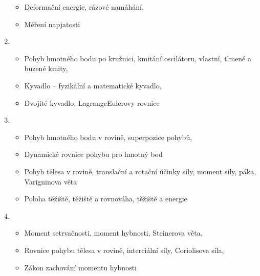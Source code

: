 \documentclass[letterpaper,10pt,english]{jupyterBook}
\begin{document}
\begin{enumerate}
\begin{itemize}
\item {} 
\sphinxAtStartPar
Deformační energie, rázové namáhání,

\item {} 
\sphinxAtStartPar
Měření napjatosti

\end{itemize}

\item {} 
\sphinxAtStartPar
{}
\begin{itemize}
\item {} 
\sphinxAtStartPar
Pohyb hmotného bodu po kružnici, kmitání oscilátoru, vlastní, tlmené a buzené kmity,

\item {} 
\sphinxAtStartPar
Kyvadlo – fyzikální a matematické kyvadlo,

\item {} 
\sphinxAtStartPar
Dvojité kyvadlo, Lagrange\sphinxhyphen{}Eulerovy rovnice

\end{itemize}

\item {} 
\sphinxAtStartPar
{}
\begin{itemize}
\item {} 
\sphinxAtStartPar
Pohyb hmotného bodu v rovině, superpozice pohybů,

\item {} 
\sphinxAtStartPar
Dynamické rovnice pohybu pro hmotný bod

\item {} 
\sphinxAtStartPar
Pohyb tělesa v rovině, translační a rotační účinky síly, moment síly, páka, Varigninova věta

\item {} 
\sphinxAtStartPar
Poloha těžiště, těžiště a rovnováha, těžiště a energie

\end{itemize}

\item {} 
\sphinxAtStartPar
{}
\begin{itemize}
\item {} 
\sphinxAtStartPar
Moment setrvačnosti, moment hybnosti, Steinerova věta,

\item {} 
\sphinxAtStartPar
Rovnice pohybu tělesa v rovině, interciální síly, Coriolisova síla,

\item {} 
\sphinxAtStartPar
Zákon zachování momentu hybnosti


\end{itemize}
\end{enumerate}
\end{document}
